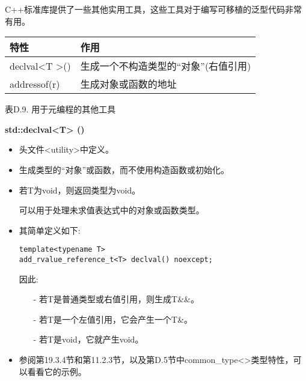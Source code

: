 

C++标准库提供了一些其他实用工具，这些工具对于编写可移植的泛型代码非常有用。

\begin{table}[H]
	\begin{center}
	\begin{tabular}{l|l}
		\hline
		\textbf{特性}                       & \textbf{作用}                                                         \\ \hline
		declval\textless{}T \textgreater{}() & 生成一个不构造类型的“对象”(右值引用) \\ \hline
		addressof(r)                         & 生成对象或函数的地址                             \\ \hline
	\end{tabular}
	\end{center}
\end{table}

\begin{center}
表D.9. 用于元编程的其他工具
\end{center}

\textbf{std::declval<T> ()}

\begin{itemize}
\item 
头文件<utility>中定义。

\item 
生成类型的“对象”或函数，而不使用构造函数或初始化。

\item 
若T为void，则返回类型为void。

可以用于处理未求值表达式中的对象或函数类型。

\item 
其简单定义如下:
\begin{lstlisting}[style=styleCXX]
template<typename T>
add_rvalue_reference_t<T> declval() noexcept;
\end{lstlisting}

因此:

\begin{itemize}
\item[-]
若T是普通类型或右值引用，则生成T\&\&。

\item[-]
若T是一个左值引用，它会产生一个T\&。

\item[-]
若T是void，它就产生void。
\end{itemize}

\item 
参阅第19.3.4节和第11.2.3节，以及第D.5节中common\_type<>类型特性，可以看看它的示例。
\end{itemize}

